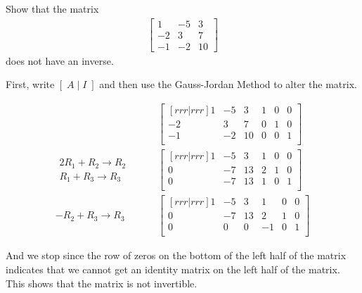 \begin{example}
Show that the matrix
%
\begin{align*}
\begin{bmatrix}
1 & -5 & 3 \\
-2 & 3 & 7 \\
-1 & -2 & 10
\end{bmatrix}
\end{align*}
does not have an inverse.

\solution

First, write $[\;A\;|\;I\;]$ and then use the Gauss-Jordan Method to alter the matrix.

\begin{align*}
& \qquad \begin{bmatrix}[rrr|rrr]
1 & -5 & 3 & 1 & 0 & 0 \\
-2 & 3 & 7 & 0 & 1 & 0 \\
-1 & -2 & 10 & 0 & 0 & 1  \\
\end{bmatrix} \\
\begin{array}{r}
2 R_1 + R_2 \rightarrow R_2 \\
 R_1 + R_3 \rightarrow R_3
\end{array} & \qquad
\begin{bmatrix}[rrr|rrr]
1 & -5 & 3 & 1 & 0 & 0 \\
0 & -7 & 13 & 2 & 1 & 0 \\
0 & -7 & 13 & 1 & 0 &  1 \\
\end{bmatrix} \\
-R_2 + R_3 \rightarrow R_3 & \qquad
\begin{bmatrix}[rrr|rrr]
1 & -5 & 3 & 1 & 0 & 0 \\
0 & -7 & 13 & 2 & 1 & 0 \\
0 & 0 & 0 & -1 & 0 &  1 \\
\end{bmatrix}
\end{align*}

And we stop since the row of zeros on the bottom of the left half of the matrix indicates that  we cannot get an identity matrix on the left half of the matrix.  This shows that the matrix is not invertible.
\end{example}



